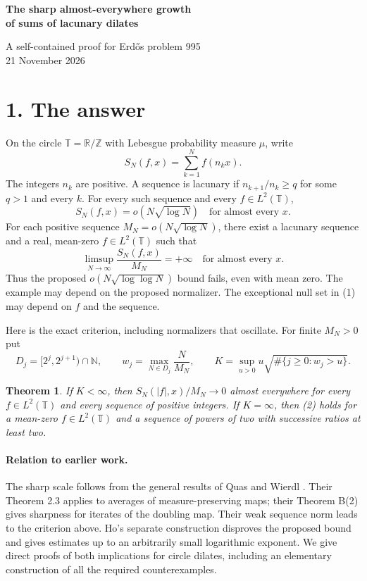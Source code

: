 \documentclass[11pt]{article}
\newtheorem*{theorem}{Theorem}
\newcommand{\T}{\mathbb T}
\newcommand{\1}{\mathbf 1}
\newcommand{\card}{\#}
\begin{document}
\begin{center}
{\huge\bfseries The sharp almost-everywhere growth\\[3pt] of sums of lacunary dilates\par}
\vspace{9pt}
{\large A self-contained proof for Erd\H{o}s problem 995}\\[4pt]
21 November 2026
\end{center}

\section*{1. The answer}
On the circle $\T=\mathbb R/\mathbb Z$ with Lebesgue probability measure $\mu$, write
\[
 S_N(f,x)=\sum_{k=1}^N f(n_kx).
\]
The integers $n_k$ are positive. A sequence is lacunary if
$n_{k+1}/n_k\ge q$ for some $q>1$ and every $k$. For every such sequence and
every $f\in L^2(\T)$,
\[
                    S_N(f,x)=o\!\left(N\sqrt{\log N}\right)
                    \quad\text{for almost every }x.                 \tag{1}
\]
For each positive sequence $M_N=o(N\sqrt{\log N})$, there exist a lacunary
sequence and a real, mean-zero $f\in L^2(\T)$ such that
\[
            \limsup_{N\to\infty}\frac{S_N(f,x)}{M_N}=+\infty
                    \quad\text{for almost every }x.                 \tag{2}
\]
Thus the proposed $o(N\sqrt{\log\log N})$ bound fails, even with mean zero.
The example may depend on the proposed normalizer. The exceptional null set
in (1) may depend on $f$ and the sequence.

Here is the exact criterion, including normalizers that oscillate.
For finite $M_N>0$ put
\[
 D_j=[2^j,2^{j+1})\cap\mathbb N,\qquad
 w_j=\max_{N\in D_j}\frac{N}{M_N},\qquad
 K=\sup_{u>0}u\sqrt{\card\{j\ge0:w_j>u\}}.
\]
\begin{theorem}
If $K<\infty$, then $S_N(|f|,x)/M_N\to0$ almost everywhere for every
$f\in L^2(\T)$ and every sequence of positive integers. If $K=\infty$,
then (2) holds for a mean-zero $f\in L^2(\T)$ and a sequence of
powers of two with successive ratios at least two.
\end{theorem}

\paragraph{Relation to earlier work.}
The sharp scale follows from the general results of Quas and Wierdl
\cite{QW}. Their Theorem 2.3 applies to averages of measure-preserving
maps; their Theorem B(2) gives sharpness for iterates of the doubling map.
Their weak sequence norm leads to the criterion above. Ho's separate
construction \cite{Ho} disproves the proposed bound and gives estimates
up to an arbitrarily small logarithmic exponent. We give direct proofs of
both implications for circle dilates, including an elementary construction
of all the required counterexamples.
\end{document}
